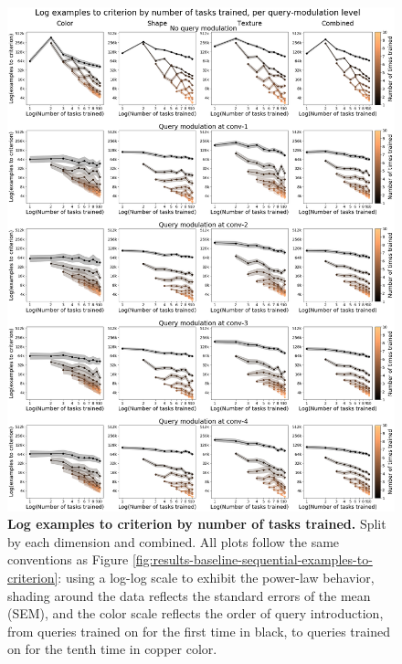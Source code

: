 \begin{figure}[!htb]
\centering
\includegraphics[width=\linewidth]{ch-results/figures/query_mod_benchmark/examples_to_criterion_per_modualtion_level_tasks_trained.png}
\caption[Log examples to criterion by number of tasks trained.]{ {\bf Log examples to criterion by number of tasks trained.} Split by each dimension and combined. All plots follow the same conventions as Figure \ref{fig:results-baseline-sequential-examples-to-criterion}: using a log-log scale to exhibit the power-law behavior, shading around the data reflects the standard errors of the mean (SEM), and the color scale reflects the order of query introduction, from queries trained on for the first time in black, to queries trained on for the tenth time in copper color.}
\label{fig:results-query-mod-benchmark-examples-to-criterion-per-modualtion-level-tasks-trained}
\end{figure}

